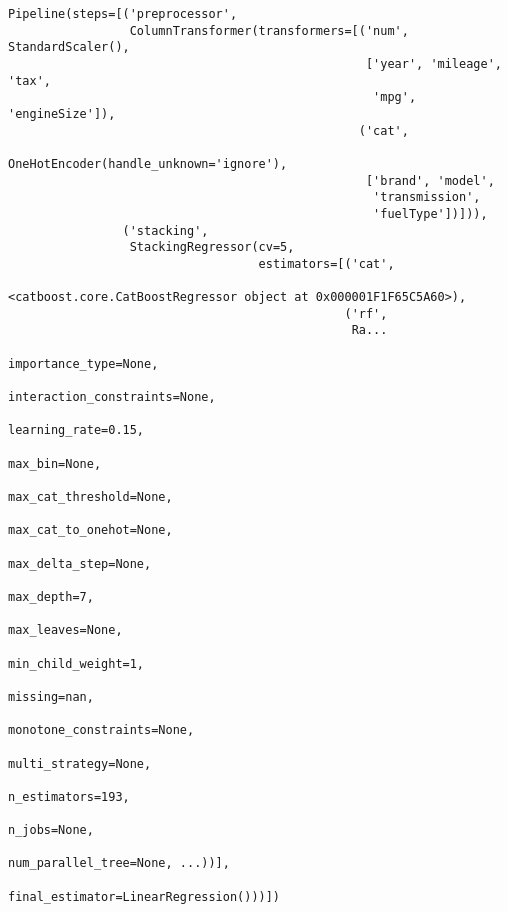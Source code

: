 \documentclass[
  letterpaper,
  DIV=11,
  numbers=noendperiod]{scrreprt}
\begin{document}
\begin{verbatim}
Pipeline(steps=[('preprocessor',
                 ColumnTransformer(transformers=[('num', StandardScaler(),
                                                  ['year', 'mileage', 'tax',
                                                   'mpg', 'engineSize']),
                                                 ('cat',
                                                  OneHotEncoder(handle_unknown='ignore'),
                                                  ['brand', 'model',
                                                   'transmission',
                                                   'fuelType'])])),
                ('stacking',
                 StackingRegressor(cv=5,
                                   estimators=[('cat',
                                                <catboost.core.CatBoostRegressor object at 0x000001F1F65C5A60>),
                                               ('rf',
                                                Ra...
                                                             importance_type=None,
                                                             interaction_constraints=None,
                                                             learning_rate=0.15,
                                                             max_bin=None,
                                                             max_cat_threshold=None,
                                                             max_cat_to_onehot=None,
                                                             max_delta_step=None,
                                                             max_depth=7,
                                                             max_leaves=None,
                                                             min_child_weight=1,
                                                             missing=nan,
                                                             monotone_constraints=None,
                                                             multi_strategy=None,
                                                             n_estimators=193,
                                                             n_jobs=None,
                                                             num_parallel_tree=None, ...))],
                                   final_estimator=LinearRegression()))])
\end{verbatim}
\end{document}

